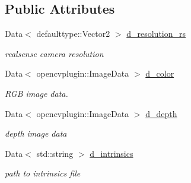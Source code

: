 \subsection*{Public Attributes}
\begin{DoxyCompactItemize}
\item 
\mbox{\label{classsofa_1_1rgbdtracking_1_1_real_sense_streamer_a4071fa1133173e5f2debdb9f281f2964}} 
Data$<$ defaulttype\+::\+Vector2 $>$ \hyperlink{classsofa_1_1rgbdtracking_1_1_real_sense_streamer_a4071fa1133173e5f2debdb9f281f2964}{d\+\_\+resolution\+\_\+rs}
\begin{DoxyCompactList}\small\item\em realsense camera resolution \end{DoxyCompactList}\item 
\mbox{\label{classsofa_1_1rgbdtracking_1_1_real_sense_streamer_a4a21504b1c8de26cda98a7dd1b7d43d2}} 
Data$<$ opencvplugin\+::\+Image\+Data $>$ \hyperlink{classsofa_1_1rgbdtracking_1_1_real_sense_streamer_a4a21504b1c8de26cda98a7dd1b7d43d2}{d\+\_\+color}
\begin{DoxyCompactList}\small\item\em R\+GB image data. \end{DoxyCompactList}\item 
\mbox{\label{classsofa_1_1rgbdtracking_1_1_real_sense_streamer_a9fbddc186f4026f029c509b49f5b16f5}} 
Data$<$ opencvplugin\+::\+Image\+Data $>$ \hyperlink{classsofa_1_1rgbdtracking_1_1_real_sense_streamer_a9fbddc186f4026f029c509b49f5b16f5}{d\+\_\+depth}
\begin{DoxyCompactList}\small\item\em depth image data \end{DoxyCompactList}\item 
\mbox{\label{classsofa_1_1rgbdtracking_1_1_real_sense_streamer_a226a9797423c62c033f9f1961c00cb7c}} 
Data$<$ std\+::string $>$ \hyperlink{classsofa_1_1rgbdtracking_1_1_real_sense_streamer_a226a9797423c62c033f9f1961c00cb7c}{d\+\_\+intrinsics}
\begin{DoxyCompactList}\small\item\em path to intrinsics file \end{DoxyCompactList}\item 

\end{DoxyCompactItemize}
